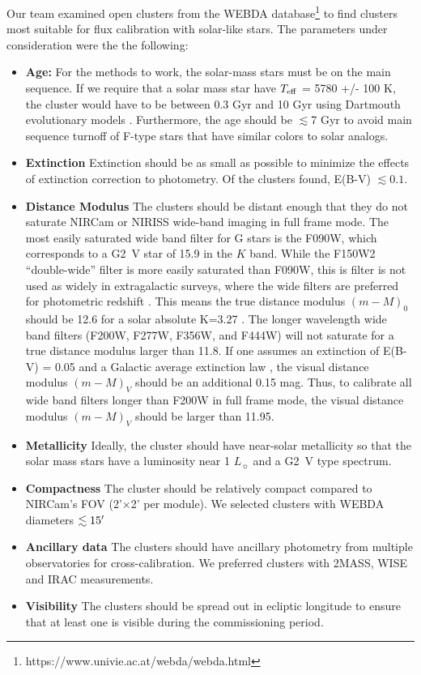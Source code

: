 \documentclass{aastex6}
\begin{document}
Our team examined open clusters from the WEBDA database\footnote{https://www.univie.ac.at/webda/webda.html} to find clusters most suitable for flux calibration with solar-like stars.
The parameters under consideration were the the following:
\begin{itemize}
\item {\bf Age:} For the methods to work, the solar-mass stars must be on the main sequence. If we require that a solar mass star have $T_{\rm eff}$ = 5780 +/- 100 K, the cluster would have to be between 0.3 Gyr and 10 Gyr using Dartmouth evolutionary models \citep{dotter2008dartmouth}. Furthermore, the age should be $\lesssim$7 Gyr to avoid main sequence turnoff of F-type stars that have similar colors to solar analogs.
\item {\bf Extinction} Extinction should be as small as possible to minimize the effects of extinction correction to photometry. Of the clusters found, E(B-V) $\lesssim 0.1$.
\item {\bf Distance Modulus} The clusters should be distant enough that they do not saturate NIRCam or NIRISS wide-band imaging in full frame mode. The most easily saturated wide band filter for G stars is the F090W, which corresponds to a G2~V star of 15.9 in the $K$ band.
While the F150W2 ``double-wide'' filter is more easily saturated than F090W, this is filter is not used as widely in extragalactic surveys, where the wide filters are preferred for photometric redshift \citep[e.g.][]{williams2018JWSTMockCatalog}.
This means the true distance modulus $(m - M)_0$ should be 12.6 for a solar absolute K=3.27 \citep{willmer2018solarMagnitude}.
The longer wavelength wide band filters (F200W, F277W, F356W, and F444W) will not saturate for a true distance modulus larger than 11.8.
If one assumes an extinction of E(B-V) = 0.05 and a Galactic average extinction law \citep{cardelli1989}, the visual distance modulus $(m- M)_V$ should be an additional 0.15 mag.
Thus, to calibrate all wide band filters longer than F200W in full frame mode, the visual distance modulus $(m- M)_V$ should be larger than 11.95.
\item {\bf Metallicity} Ideally, the cluster should have near-solar metallicity so that the solar mass stars have a luminosity near 1 $L_\sun$ and a G2~V type spectrum.
\item {\bf Compactness} The cluster should be relatively compact compared to NIRCam's FOV (2'$\times$2' per module).
We selected clusters with WEBDA diameters $\lesssim 15\mbox{$^\prime$}$
\item {\bf Ancillary data} The clusters should have ancillary photometry from multiple observatories for cross-calibration. We preferred clusters with 2MASS, WISE and IRAC measurements.
\item {\bf Visibility} The clusters should be spread out in ecliptic longitude to ensure that at least one is visible during the commissioning period.
\end{itemize}
\end{document}
